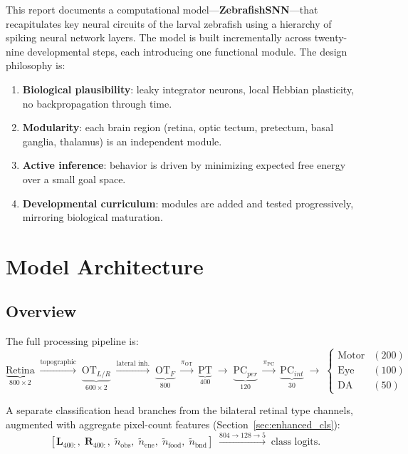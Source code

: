 \documentclass[11pt,a4paper]{article}
\begin{document}
This report documents a computational model---\textbf{ZebrafishSNN}---that
recapitulates key neural circuits of the larval zebrafish using a hierarchy of
spiking neural network layers.
The model is built incrementally across twenty-nine developmental steps, each
introducing one functional module.
The design philosophy is:
\begin{enumerate}[nosep]
  \item \textbf{Biological plausibility}: leaky integrator neurons, local
    Hebbian plasticity, no backpropagation through time.
  \item \textbf{Modularity}: each brain region (retina, optic tectum,
    pretectum, basal ganglia, thalamus) is an independent module.
  \item \textbf{Active inference}: behavior is driven by minimizing expected
    free energy over a small goal space.
  \item \textbf{Developmental curriculum}: modules are added and tested
    progressively, mirroring biological maturation.
\end{enumerate}

\section{Model Architecture}\label{sec:arch}

\subsection{Overview}

The full processing pipeline is:
\[
  \underbrace{\text{Retina}}_{\text{800}\times 2}
  \;\xrightarrow{\text{topographic}}\;
  \underbrace{\text{OT}_{L/R}}_{\text{600}\times 2}
  \;\xrightarrow{\text{lateral inh.}}\;
  \underbrace{\text{OT}_F}_{800}
  \;\xrightarrow{\pi_\text{OT}}\;
  \underbrace{\text{PT}}_{400}
  \;\rightarrow\;
  \underbrace{\text{PC}_{per}}_{120}
  \;\xrightarrow{\pi_\text{PC}}\;
  \underbrace{\text{PC}_{int}}_{30}
  \;\rightarrow\;
  \begin{cases}
    \text{Motor} & (200) \\
    \text{Eye}   & (100) \\
    \text{DA}    & (50)
  \end{cases}
\]

A separate classification head branches from the bilateral retinal type
channels, augmented with aggregate pixel-count features
(Section~\ref{sec:enhanced_cls}):
\[
  [\mathbf{L}_{400:},\; \mathbf{R}_{400:},\;
   \tilde{n}_\text{obs},\; \tilde{n}_\text{ene},\;
   \tilde{n}_\text{food},\; \tilde{n}_\text{bnd}]
  \;\xrightarrow{804 \to 128 \to 5}\;
  \text{class logits}.
\]
\end{document}
